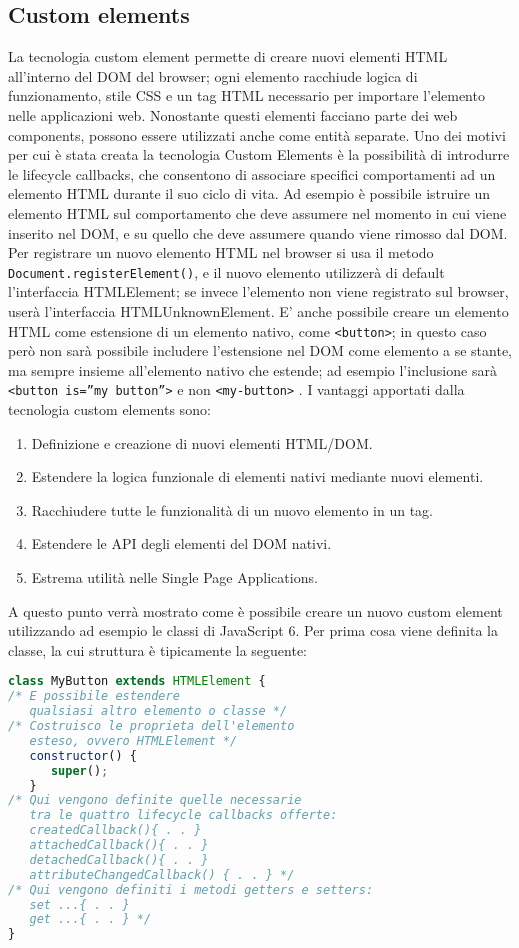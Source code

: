 \subsection{Custom elements}
\label{sec:chapter_tecnologie_abilitanti_custom_elements}

La tecnologia custom element permette di creare nuovi elementi HTML all’interno del DOM del browser; ogni elemento racchiude logica di funzionamento, stile CSS e un tag HTML necessario per importare l’elemento nelle applicazioni web. 
Nonostante questi elementi facciano parte dei web components, possono essere utilizzati anche come entità separate. Uno dei motivi per cui è stata creata la tecnologia Custom Elements è la possibilità di introdurre le lifecycle callbacks, che consentono di associare specifici comportamenti ad un elemento HTML durante il suo ciclo di vita. Ad esempio è possibile istruire un elemento HTML sul comportamento che deve assumere nel momento in cui viene inserito nel DOM, e su quello che deve assumere quando viene rimosso dal DOM. 
Per registrare un nuovo elemento HTML nel browser si usa il metodo \texttt{Document.registerElement()}, e il nuovo elemento utilizzerà di default l’interfaccia HTMLElement; se invece l’elemento non viene registrato sul browser, userà l’interfaccia HTMLUnknownElement. E’ anche possibile creare un elemento HTML come estensione di un elemento nativo, come \texttt{<button>}; in questo caso però non sarà possibile includere l’estensione nel DOM come elemento a se stante, ma sempre insieme all’elemento nativo che estende; ad esempio l’inclusione sarà \texttt{<button is=”my button”>} e non \texttt{<my-button>} .
I vantaggi apportati dalla tecnologia custom elements sono:
\begin{enumerate}
\item Definizione e creazione di nuovi elementi HTML/DOM.
\item Estendere la logica funzionale di elementi nativi mediante nuovi elementi.
\item Racchiudere tutte le funzionalità di un nuovo elemento in un tag.
\item Estendere le API degli elementi del DOM nativi.
\item Estrema utilità nelle Single Page Applications.
\end{enumerate}
A questo punto verrà mostrato come è possibile creare un nuovo custom element utilizzando ad esempio le classi di JavaScript 6.
Per prima cosa viene definita la classe, la cui struttura è tipicamente la seguente:
\begin{lstlisting}[language=JavaScript]
class MyButton extends HTMLElement {    
/* E possibile estendere 
   qualsiasi altro elemento o classe */
/* Costruisco le proprieta dell'elemento 
   esteso, ovvero HTMLElement */     
   constructor() {          
      super();                         
   }   								  
/* Qui vengono definite quelle necessarie 
   tra le quattro lifecycle callbacks offerte:
   createdCallback(){ . . } 
   attachedCallback(){ . . } 
   detachedCallback(){ . . } 
   attributeChangedCallback() { . . } */
/* Qui vengono definiti i metodi getters e setters:
   set ...{ . . } 
   get ...{ . . } */
}
\end{lstlisting}
